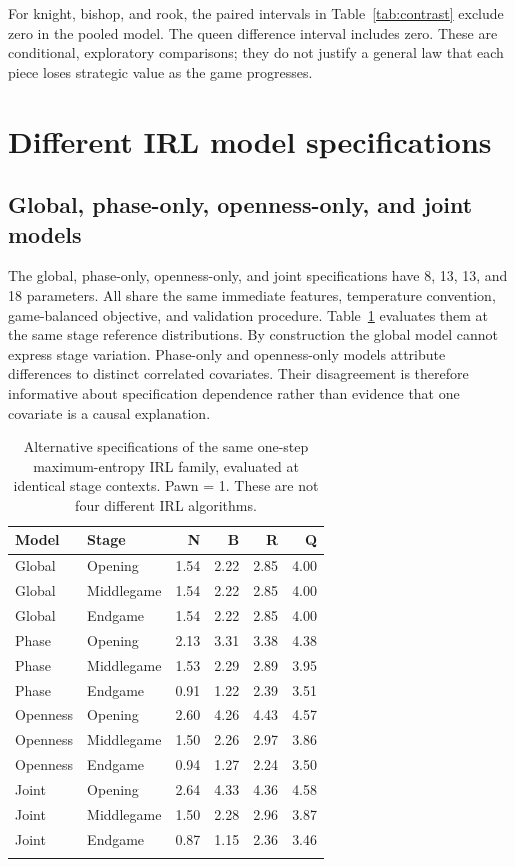 \documentclass{jcst}
\begin{document}
For knight, bishop, and rook, the paired intervals in Table~\ref{tab:contrast} exclude zero in the pooled model. The queen difference interval includes zero. These are conditional, exploratory comparisons; they do not justify a general law that each piece loses strategic value as the game progresses.


\section{Different IRL model specifications}
\subsection{Global, phase-only, openness-only, and joint models}
The global, phase-only, openness-only, and joint specifications have 8, 13, 13, and 18 parameters. All share the same immediate features, temperature convention, game-balanced objective, and validation procedure. Table~\ref{tab:family} evaluates them at the same stage reference distributions. By construction the global model cannot express stage variation. Phase-only and openness-only models attribute differences to distinct correlated covariates. Their disagreement is therefore informative about specification dependence rather than evidence that one covariate is a causal explanation.
\begin{table}[tbp]\centering
\small
\caption{Alternative specifications of the same one-step maximum-entropy IRL family, evaluated at identical stage contexts. Pawn = 1. These are not four different IRL algorithms.}\label{tab:family}
\begin{tabular}{llrrrr}
\toprule
Model & Stage & N & B & R & Q\\\midrule
Global & Opening & 1.54 & 2.22 & 2.85 & 4.00\\
Global & Middlegame & 1.54 & 2.22 & 2.85 & 4.00\\
Global & Endgame & 1.54 & 2.22 & 2.85 & 4.00\\
\addlinespace
Phase & Opening & 2.13 & 3.31 & 3.38 & 4.38\\
Phase & Middlegame & 1.53 & 2.29 & 2.89 & 3.95\\
Phase & Endgame & 0.91 & 1.22 & 2.39 & 3.51\\
\addlinespace
Openness & Opening & 2.60 & 4.26 & 4.43 & 4.57\\
Openness & Middlegame & 1.50 & 2.26 & 2.97 & 3.86\\
Openness & Endgame & 0.94 & 1.27 & 2.24 & 3.50\\
\addlinespace
Joint & Opening & 2.64 & 4.33 & 4.36 & 4.58\\
Joint & Middlegame & 1.50 & 2.28 & 2.96 & 3.87\\
Joint & Endgame & 0.87 & 1.15 & 2.36 & 3.46\\
\addlinespace
\bottomrule\end{tabular}\end{table}
\end{document}
